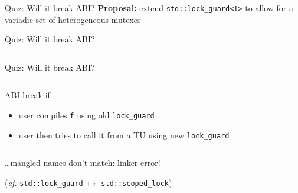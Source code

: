 \begin{frame}{Quiz: Will it break ABI?}
    \textbf{Proposal:} extend \texttt{std::lock\_guard<T>} to allow for a variadic set of heterogeneous mutexes

    \vspace*{5mm}

    \centering


    \scalebox{2}{$\downarrow$}

\end{frame}

\begin{frame}[fragile]{Quiz: Will it break ABI?}
    \begin{columns}[t]
        \begin{column}{.4\textwidth}
        \end{column}
        \begin{column}{.5\textwidth}
        \end{column}
    \end{columns}
\end{frame}

\begin{frame}[fragile]{Quiz: Will it break ABI?}
    \begin{columns}[t]
        \begin{column}{.4\textwidth}
            \textcolor{vertexDarkRed}{ABI break} if
            \begin{itemize}
                \item user compiles \texttt{f} using old \texttt{lock\_guard}
                \item user then tries to call it from a TU using new \texttt{lock\_guard}
            \end{itemize}
        \end{column}
        \begin{column}{.5\textwidth}
        \end{column}
    \end{columns}
    \ldots mangled names don't match: linker error!

    \begin{center}
        \footnotesize (\textit{cf.} \href{https://en.cppreference.com/w/cpp/thread/lock_guard}{\texttt{std::lock\_guard}} $\mapsto$ \href{https://en.cppreference.com/w/cpp/thread/scoped_lock}{\texttt{std::scoped\_lock}})
    \end{center}
\end{frame}

